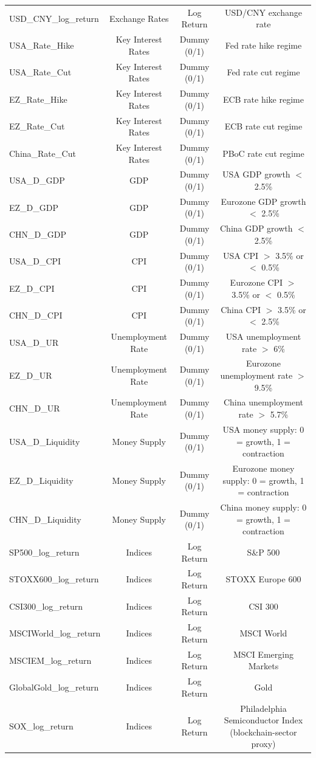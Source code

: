 \begin{table}[h]
\begin{tabular}{lccc}
    USD\_CNY\_log\_return & Exchange Rates & Log Return & USD/CNY exchange rate \\ 
    USA\_Rate\_Hike & Key Interest Rates & Dummy (0/1) & Fed rate hike regime \\ 
    USA\_Rate\_Cut & Key Interest Rates & Dummy (0/1) & Fed rate cut regime \\ 
    EZ\_Rate\_Hike & Key Interest Rates & Dummy (0/1) & ECB rate hike regime \\ 
    EZ\_Rate\_Cut & Key Interest Rates & Dummy (0/1) & ECB rate cut regime \\ 
    China\_Rate\_Cut & Key Interest Rates & Dummy (0/1) & PBoC rate cut regime \\ 
    USA\_D\_GDP & GDP & Dummy (0/1) & USA GDP growth $<$ 2.5\% \\ 
    EZ\_D\_GDP & GDP & Dummy (0/1) & Eurozone GDP growth $<$ 2.5\% \\ 
    CHN\_D\_GDP & GDP & Dummy (0/1) & China GDP growth $<$ 2.5\% \\ 
    USA\_D\_CPI & CPI & Dummy (0/1) & USA CPI $>$ 3.5\% or $<$ 0.5\% \\ 
    EZ\_D\_CPI & CPI & Dummy (0/1) & Eurozone CPI $>$ 3.5\% or $<$ 0.5\% \\ 
    CHN\_D\_CPI & CPI & Dummy (0/1) & China CPI $>$ 3.5\% or $<$ 2.5\% \\ 
    USA\_D\_UR & Unemployment Rate & Dummy (0/1) & USA unemployment rate $>$ 6\% \\ 
    EZ\_D\_UR & Unemployment Rate & Dummy (0/1) & Eurozone unemployment rate $>$ 9.5\% \\ 
    CHN\_D\_UR & Unemployment Rate & Dummy (0/1) & China unemployment rate $>$ 5.7\% \\ 
    USA\_D\_Liquidity & Money Supply & Dummy (0/1) & USA money supply: 0 = growth, 1 = contraction \\ 
    EZ\_D\_Liquidity & Money Supply & Dummy (0/1) & Eurozone money supply: 0 = growth, 1 = contraction \\ 
    CHN\_D\_Liquidity & Money Supply & Dummy (0/1) & China money supply: 0 = growth, 1 = contraction \\ 
    SP500\_log\_return & Indices & Log Return & S\&P 500 \\ 
    STOXX600\_log\_return & Indices & Log Return & STOXX Europe 600 \\ 
    CSI300\_log\_return & Indices & Log Return & CSI 300 \\ 
    MSCIWorld\_log\_return & Indices & Log Return & MSCI World \\ 
    MSCIEM\_log\_return & Indices & Log Return & MSCI Emerging Markets \\ 
    GlobalGold\_log\_return & Indices & Log Return & Gold \\ 
    SOX\_log\_return & Indices & Log Return & Philadelphia Semiconductor Index (blockchain-sector proxy) \\ 
    \bottomrule
  \end{tabular}
\end{table}